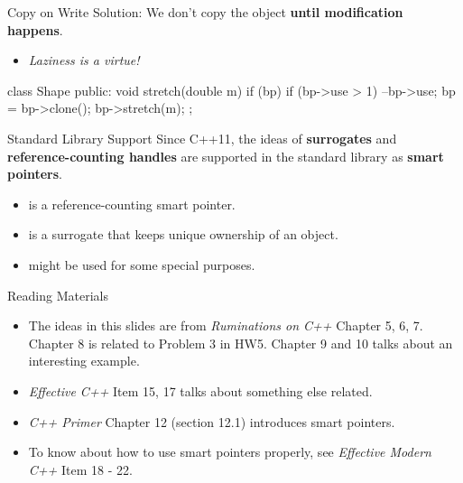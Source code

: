 \documentclass{beamer}
\begin{document}
\begin{frame}[fragile]{Copy on Write}
    Solution: We don't copy the object \textbf{until modification happens}.
    \begin{itemize}
        \item \textit{Laziness is a virtue!}
    \end{itemize}
    \begin{cpp}
class Shape {
 public:
  void stretch(double m) {
    if (bp) {
      if (bp->use > 1) {
        --bp->use;
        bp = bp->clone();
      }
      bp->stretch(m);
    }
  }
};
    \end{cpp}
\end{frame}

\begin{frame}{Standard Library Support}
    Since C++11, the ideas of \textbf{surrogates} and \textbf{reference-counting handles} are supported in the standard library  as \textbf{smart pointers}.
    \begin{itemize}
        \item {} is a reference-counting smart pointer.
        \item {} is a surrogate that keeps unique ownership of an object.
        \item {} might be used for some special purposes.
    \end{itemize}
\end{frame}

\begin{frame}{Reading Materials}
    \begin{itemize}
        \item The ideas in this slides are from \textit{Ruminations on C++} Chapter 5, 6, 7. Chapter 8 is related to Problem 3 in HW5. Chapter 9 and 10 talks about an interesting example.
        \item \textit{Effective C++} Item 15, 17 talks about something else related.
        \item \textit{C++ Primer} Chapter 12 (section 12.1) introduces smart pointers.
        \item To know about how to use smart pointers properly, see \textit{Effective Modern C++} Item 18 - 22.
    \end{itemize}
\end{frame}
\end{document}
